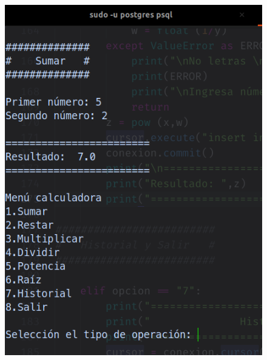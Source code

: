 \documentclass[12pt,letterpaper]{article}
\begin{document}
\begin{multicols}{2}
\begin{figure}[H]
\centering
\includegraphics[width = \columnwidth]{calc_3.png}
\end{figure}


\end{multicols}
\end{document}
